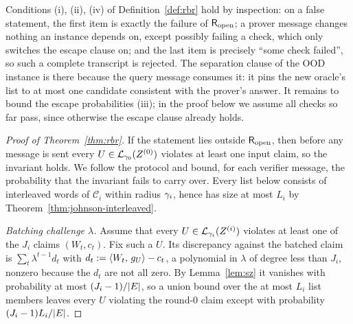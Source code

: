 Conditions (i), (ii), (iv) of Definition~\ref{def:rbr} hold by inspection: on a false statement, the first item is exactly the failure of $\mathsf{R}_{\mathrm{open}}$; a prover message changes nothing an instance depends on, except possibly failing a check, which only switches the escape clause on; and the last item is precisely ``some check failed'', so such a complete transcript is rejected. The separation clause of the OOD instance is there because the query message consumes it: it pins the new oracle's list to at most one candidate consistent with the prover's answer. It remains to bound the escape probabilities (iii); in the proof below we assume all checks so far pass, since otherwise the escape clause already holds.

\begin{proof}[Proof of Theorem~\ref{thm:rbr}]
If the statement lies outside $\mathsf{R}_{\mathrm{open}}$, then before any message is sent every $U \in \mathcal{L}_{\gamma_0}(Z^{(0)})$ violates at least one input claim, so the invariant holds. We follow the protocol and bound, for each verifier message, the probability that the invariant fails to carry over. Every list below consists of interleaved words of $\mathcal{C}_i$ within radius $\gamma_i$, hence has size at most $L_i$ by Theorem~\ref{thm:johnson-interleaved}.

\medskip\noindent\emph{Batching challenge $\lambda$.}
Assume that every $U \in \mathcal{L}_{\gamma_i}(Z^{(i)})$ violates at least one of the $J_i$ claims $(W_t, c_t)$. Fix such a $U$. Its discrepancy against the batched claim is $\sum_{t} \lambda^{t - 1} d_t$ with $d_t := \langle W_t,\, g_U \rangle - c_t$, a polynomial in $\lambda$ of degree less than $J_i$, nonzero because the $d_t$ are not all zero. By Lemma~\ref{lem:sz} it vanishes with probability at most $(J_i - 1)/|E|$, so a union bound over the at most $L_i$ list members leaves every $U$ violating the round-$0$ claim except with probability $(J_i - 1) L_i / |E|$.


\end{proof}
